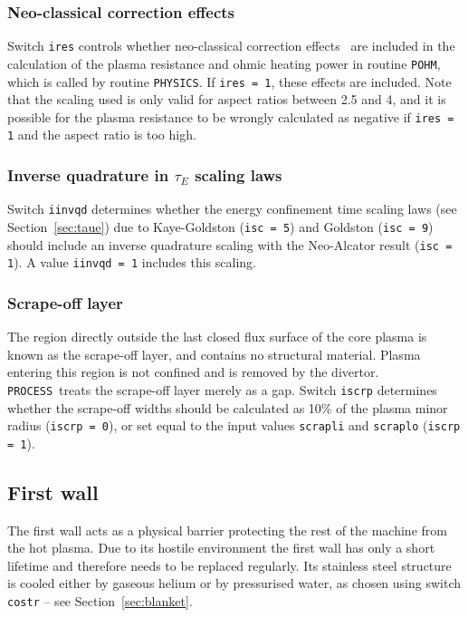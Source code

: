 \documentclass[11pt,a4paper]{report}
\newcommand{\process}{\mbox{\texttt{PROCESS}}}
\begin{document}
\subsubsection*{Neo-classical correction effects}

Switch \texttt{ires} controls whether neo-classical correction
effects~\cite{Uckan} are included in the calculation of the plasma resistance
and ohmic heating power in routine \texttt{POHM}, which is called by routine
\texttt{PHYSICS}. If \texttt{ires = 1}, these effects are included. Note that
the scaling used is only valid for aspect ratios between 2.5 and 4, and it is
possible for the plasma resistance to be wrongly calculated as negative if
\texttt{ires = 1} and the aspect ratio is too high.

\subsubsection*{Inverse quadrature in $\tau_E$ scaling laws}

Switch \texttt{iinvqd} determines whether the energy confinement time scaling
laws (see Section~\ref{sec:taue}) due to Kaye-Goldston (\texttt{isc = 5}) and
Goldston (\texttt{isc = 9}) should include an inverse quadrature scaling with
the Neo-Alcator result (\texttt{isc = 1}). A value \texttt{iinvqd = 1}
includes this scaling.

\subsubsection*{Scrape-off layer}

The region directly outside the last closed flux surface of the core plasma is
known as the scrape-off layer, and contains no structural material.  Plasma
entering this region is not confined and is removed by the
divertor. \process\ treats the scrape-off layer merely as a gap. Switch
\texttt{iscrp} determines whether the scrape-off widths should be calculated
as 10\% of the plasma minor radius (\texttt{iscrp = 0}), or set equal to the
input values \texttt{scrapli} and \texttt{scraplo} (\texttt{iscrp = 1}).

\subsection{First wall}

The first wall acts as a physical barrier protecting the rest of the machine
from the hot plasma. Due to its hostile environment the first wall has only a
short lifetime and therefore needs to be replaced regularly. Its stainless
steel structure is cooled either by gaseous helium or by pressurised water, as
chosen using switch \texttt{costr} -- see Section~\ref{sec:blanket}.
\end{document}
